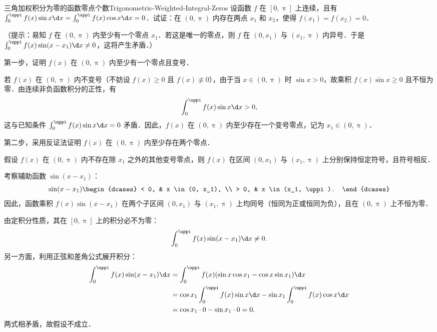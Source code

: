 \begin{problem}{三角加权积分为零的函数零点个数}{Trigonometric-Weighted-Integral-Zeros}
    设函数 $f$ 在 $[0, \uppi]$ 上连续，且有 $\int_0^{\uppi} f(x) \sin x \d x = \int_0^{\uppi} f(x) \cos x \d x = 0$．试证：在 $(0, \uppi)$ 内存在两点 $x_1$ 和 $x_2$，使得 $f(x_1) = f(x_2) = 0$．

    （提示：易知 $f$ 在 $(0, \uppi)$ 内至少有一个零点 $x_1$．若这是唯一的零点，则 $f$ 在 $(0, x_1)$ 与 $(x_1, \uppi)$ 内异号．于是 $\int_0^{\uppi} f(x)\sin(x - x_1)\d x \neq 0$，这将产生矛盾．）
\end{problem}

\begin{myproof}
    第一步，证明 $f(x)$ 在 $(0, \uppi)$ 内至少有一个零点且变号．

    若 $f(x)$ 在 $(0, \uppi)$ 内不变号（不妨设 $f(x) \geqslant 0$ 且 $f(x) \not\equiv 0$），由于当 $x \in (0, \uppi)$ 时 $\sin x > 0$，故乘积 $f(x)\sin x \geqslant 0$ 且不恒为零．由连续非负函数积分的正性，有
    \begin{equation}
        \int_0^{\uppi} f(x) \sin x \d x > 0,
    \end{equation}
    这与已知条件 $\int_0^{\uppi} f(x) \sin x \d x = 0$ 矛盾．因此，$f(x)$ 在 $(0, \uppi)$ 内至少存在一个变号零点，记为 $x_1 \in (0, \uppi)$．

    第二步，采用反证法证明 $f(x)$ 在 $(0, \uppi)$ 内至少存在两个零点．

    假设 $f(x)$ 在 $(0, \uppi)$ 内不存在除 $x_1$ 之外的其他变号零点，则 $f(x)$ 在区间 $(0, x_1)$ 与 $(x_1, \uppi)$ 上分别保持恒定符号，且符号相反．

    考察辅助函数 $\sin(x - x_1)$：
    \begin{equation}
        \sin(x - x_1) \begin{dcases} < 0, & x \in (0, x_1), \\ > 0, & x \in (x_1, \uppi). \end{dcases}
    \end{equation}
    因此，函数乘积 $f(x)\sin(x - x_1)$ 在两个子区间 $(0, x_1)$ 与 $(x_1, \uppi)$ 上均同号（恒同为正或恒同为负），且在 $(0, \uppi)$ 上不恒为零．

    由定积分性质，其在 $[0, \uppi]$ 上的积分必不为零：
    \begin{equation}
        \int_0^{\uppi} f(x) \sin(x - x_1) \d x \neq 0.
    \end{equation}
    另一方面，利用正弦和差角公式展开积分：
    \begin{equation}
        \begin{aligned}
            \int_0^{\uppi} f(x) \sin(x - x_1) \d x & = \int_0^{\uppi} f(x) (\sin x \cos x_1 - \cos x \sin x_1) \d x                        \\
                                                   & = \cos x_1 \int_0^{\uppi} f(x) \sin x \d x - \sin x_1 \int_0^{\uppi} f(x) \cos x \d x \\
                                                   & = \cos x_1 \cdot 0 - \sin x_1 \cdot 0 = 0.
        \end{aligned}
    \end{equation}
    两式相矛盾，故假设不成立．


\end{myproof}
